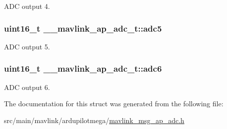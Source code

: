 A\+D\+C output 4. 

\hypertarget{struct____mavlink__ap__adc__t_a2b722957aacef288219075497b917bd4}{
\subsubsection[{adc5}]{\setlength{\rightskip}{0pt plus 5cm}uint16\+\_\+t \+\_\+\+\_\+mavlink\+\_\+ap\+\_\+adc\+\_\+t\+::adc5}}\label{struct____mavlink__ap__adc__t_a2b722957aacef288219075497b917bd4}


A\+D\+C output 5. 

\hypertarget{struct____mavlink__ap__adc__t_ab9eddc7e8962f119f2452783315d22ae}{
\subsubsection[{adc6}]{\setlength{\rightskip}{0pt plus 5cm}uint16\+\_\+t \+\_\+\+\_\+mavlink\+\_\+ap\+\_\+adc\+\_\+t\+::adc6}}\label{struct____mavlink__ap__adc__t_ab9eddc7e8962f119f2452783315d22ae}


A\+D\+C output 6. 



The documentation for this struct was generated from the following file\+:\begin{DoxyCompactItemize}
\item 
src/main/mavlink/ardupilotmega/\hyperlink{mavlink__msg__ap__adc_8h}{mavlink\+\_\+msg\+\_\+ap\+\_\+adc.\+h}\end{DoxyCompactItemize}

